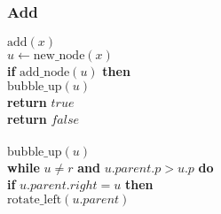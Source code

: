 \documentclass{beamer}
\newcommand{\eq}{=}
\begin{document}
\begin{frame}[shrink]
\frametitle{Add}
\begin{flushleft}
\hspace*{1em} \ensuremath{\mathrm{add}(\ensuremath{\mathit{x}})}\\
\hspace*{1em} \hspace*{1em} \ensuremath{\ensuremath{\mathit{u}} \gets  \ensuremath{\mathrm{new\_node}(\ensuremath{\mathit{x}})}}\\
\hspace*{1em} \hspace*{1em} {\color{black} \textbf{if}} \ensuremath{\mathrm{add\_node}(\ensuremath{\mathit{u}})} {\color{black} \textbf{then}} \\
\hspace*{1em} \hspace*{1em} \hspace*{1em} \ensuremath{\mathrm{bubble\_up}(\ensuremath{\mathit{u}})}\\
\hspace*{1em} \hspace*{1em} \hspace*{1em} {\color{black} \textbf{return}} \ensuremath{\ensuremath{\mathit{true}}}\\
\hspace*{1em} \hspace*{1em} {\color{black} \textbf{return}} \ensuremath{\ensuremath{\mathit{false}}}\\
\ \\
\hspace*{1em} \ensuremath{\mathrm{bubble\_up}(\ensuremath{\mathit{u}})}\\
\hspace*{1em} \hspace*{1em} {\color{black} \textbf{while}} \ensuremath{\ensuremath{\mathit{u}} \ne r} {\color{black} \textbf{and}} \ensuremath{\ensuremath{\mathit{u}}.\ensuremath{\mathit{parent}}.\ensuremath{\mathit{p}} > \ensuremath{\mathit{u}}.p} {\color{black} \textbf{do}} \\
\hspace*{1em} \hspace*{1em} \hspace*{1em} {\color{black} \textbf{if}} \ensuremath{\ensuremath{\mathit{u}}.\ensuremath{\mathit{parent}}.\ensuremath{\mathit{right}} \eq u} {\color{black} \textbf{then}} \\
\hspace*{1em} \hspace*{1em} \hspace*{1em} \hspace*{1em} \ensuremath{\mathrm{rotate\_left}(\ensuremath{\mathit{u}}.\ensuremath{\mathit{parent}})}\\

\end{flushleft}
\end{frame}
\end{document}
